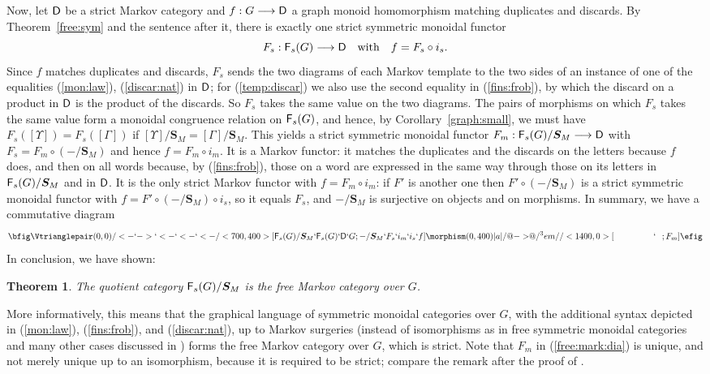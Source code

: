\documentclass[12pt]{amsart}
\theoremstyle{plain}
\newtheorem{thm}{Theorem}[section]
\theoremstyle{definition}
\theoremstyle{remark}
\numberwithin{equation}{section}
\theoremstyle{plain}
\newcommand{\0}{\emptyset}
\newcommand{\fun}{\longrightarrow}
\newcommand{\cat}[1]{\textup{\textsf{#1}}}
\begin{document}
Now, let $\cat D$ be a strict Markov category and $f : G \fun  \cat D$ a graph monoid homomorphism matching duplicates and discards. By Theorem~\ref{free:sym} and the sentence after it, there is exactly one strict symmetric monoidal functor
\[
F_s : \cat F_s(G) \fun \cat D \quad \text{with} \quad f = F_s \circ i_s.
\]
Since $f$ matches duplicates and discards, $F_s$ sends the two diagrams of each Markov template to the two sides of an instance of one of the equalities (\ref{mon:law}), (\ref{discar:nat}) in $\cat D$; for (\ref{temp:discar}) we also use the second equality in (\ref{fins:frob}), by which the discard on a product in $\cat D$ is the product of the discards. So $F_s$ takes the same value on the two diagrams. The pairs of morphisms on which $F_s$ takes the same value form a monoidal congruence relation on $\cat F_s(G)$, and hence, by Corollary~\ref{graph:small}, we must have $F_s([\Upsilon]) = F_s([\Gamma])$ if $[\Upsilon] /  \bm S_M =  [\Gamma] /  \bm S_M$. This yields a strict symmetric monoidal functor $F_m : \cat F_s(G) /  \bm S_M \fun \cat D$ with $F_s = F_m \circ (- / \bm S_M)$ and hence $f = F_m \circ i_m$. It is a Markov functor: it matches the duplicates and the discards on the letters because $f$ does, and then on all words because, by (\ref{fins:frob}), those on a word are expressed in the same way through those on its letters in $\cat F_s(G) /  \bm S_M$ and in $\cat D$. It is the only strict Markov functor with $f = F_m \circ i_m$: if $F'$ is another one then $F' \circ (- / \bm S_M)$ is a strict symmetric monoidal functor with $f = F' \circ (- / \bm S_M) \circ i_s$, so it equals $F_s$, and $- / \bm S_M$ is surjective on objects and on morphisms. In summary, we have a commutative diagram
\begin{equation}\label{free:mark:dia}
  \bfig
      \Vtrianglepair(0,0)/<-`->`<-`<-`<-/<700,400>[\cat F_s(G) / \bm S_M`\cat F_s(G)`\cat D`G; - / \bm S_M`F_s`i_m`i_s`f]
      \morphism(0,400)|a|/{@{->}@/^3em/}/<1400,0>[\phantom{\cat F_s(G) / \bm S_M}`\phantom{\cat D};F_m]
  \efig
\end{equation}
In conclusion, we have shown:

\begin{thm}\label{free:markov:quot}
The quotient category $\cat F_s(G) / \bm S_M$ is the free Markov category over $G$.
\end{thm}

More informatively, this means that the graphical language of  symmetric monoidal categories over $G$, with the additional syntax depicted in (\ref{mon:law}), (\ref{fins:frob}), and (\ref{discar:nat}), up to Markov surgeries  (instead of isomorphisms as in free symmetric monoidal categories and many other cases discussed in \cite{selinger2010survey}) forms the free  Markov category over $G$, which is strict. Note that $F_m$ in (\ref{free:mark:dia}) is unique, and not merely unique up to an isomorphism, because it is required to be strict; compare the remark after the proof of \cite[Theorem~1.2]{joyal1991geometry}.
\end{document}
